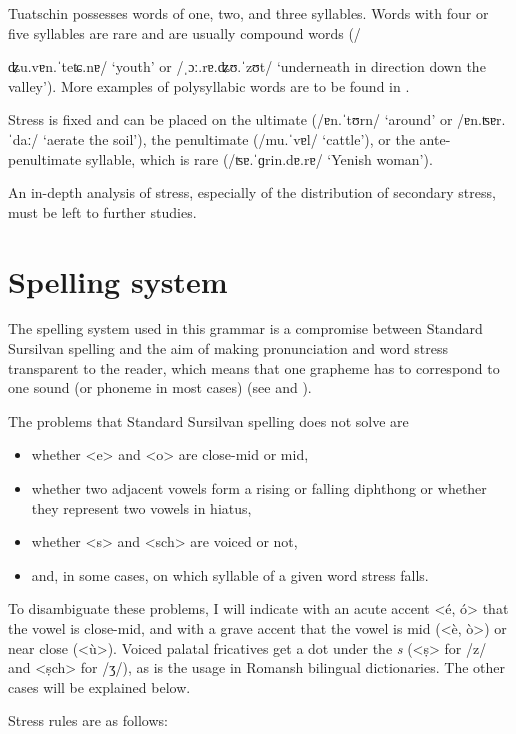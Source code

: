  Tuatschin possesses words of one, two, and three syllables. Words with four or five syllables are rare and are usually compound words (/{ʥu.vɐn.ˈteʨ.nɐ/ `youth' or /ˌɔː.rɐ.ʥʊ.ˈzʊt/ `underneath in direction down the valley'). More examples of polysyllabic words are to be found in .
 	
 	Stress is fixed and can be placed on the ultimate (/ɐn.ˈtʊrn/ `around' or /ɐn.ʦɐr.ˈdaː/ `aerate the soil'), the penultimate (/mu.ˈvɐl/ `cattle'), or the ante-penultimate syllable, which is rare (/ʦɐ.ˈɡrin.dɐ.rɐ/ `Yenish woman').

An in-depth analysis of stress, especially of the distribution of secondary stress, must be left to further studies.


\section{Spelling system}
The spelling system used in this grammar is a compromise between Standard Sursilvan spelling and the aim of making pronunciation and word stress transparent to the reader, which means that one grapheme has to correspond to one sound (or phoneme in most cases) (see  and ). 

The problems that Standard Sursilvan spelling does not solve are

\begin{itemize}
\item whether <e> and <o> are close-mid or mid, 
\item whether two adjacent vowels form a rising or falling diphthong or whether they represent two vowels in hiatus,
\item whether <s> and <sch> are voiced or not, 
\item and, in some cases, on which syllable of a given word stress falls.
\end{itemize}
 
To disambiguate these problems, I will indicate with an acute accent <é, ó> that the vowel is close-mid, and with a grave accent that the vowel is mid (<è, ò>) or near close (<ù>). Voiced palatal fricatives get a dot under the \textit{s} (<ṣ> for /z/ and <ṣch> for /ʒ/), as is the usage in Romansh bilingual dictionaries. The other cases will be explained below.

Stress rules are as follows:

}
